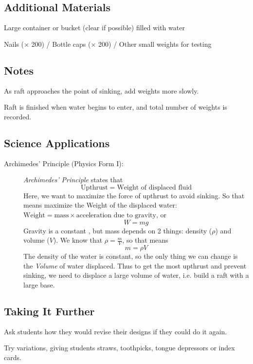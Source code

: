 \subsection{Additional Materials}
\begin{itemize*}
\item Large container or bucket (clear if possible) filled with water
\item Nails ($\times$ 200) / Bottle caps ($\times$ 200) / Other small weights for testing
\end{itemize*}

\subsection{Notes}
\begin{itemize*}
\item As raft approaches the point of sinking, add weights more slowly.
\item Raft is finished when water begins to enter, and total number of weights is recorded.
\end{itemize*}

\subsection{Science Applications}
\begin{description}
\item[Archimedes' Principle (Physics Form I):]{\emph{Archimedes' Principle} states that $$\mathrm{Upthrust} = \text{Weight of displaced fluid}$$
Here, we want to maximize the force of upthrust to avoid sinking. So that means maximize the Weight of the displaced water: $\mathrm{Weight} = \mathrm{mass} \times \text{acceleration due to gravity}$, or					 $$W=mg$$
Gravity is a constant , but mass depends on 2 things: density ($\rho$) and volume ($V$). We know that
$\rho = \frac{m}{V}$, so that means				           $$m = \rho V$$
The density of the water is constant, so the only thing we can change is the \emph{Volume} of water displaced. Thus to get the most upthrust and prevent sinking, we need to displace a large volume of water, i.e. build a raft with a large base.}
\end{description}

\subsection{Taking It Further}
\begin{itemize*}
\item Ask students how they would revise their designs if they could do it again.
\item Try variations, giving students straws, toothpicks, tongue depressors or index cards.
\end{itemize*}

